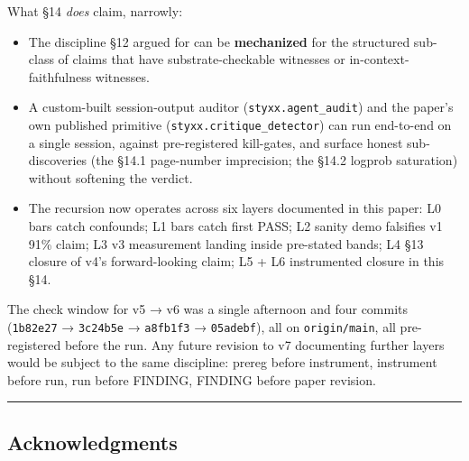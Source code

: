 \documentclass[
]{article}
\providecommand{\tightlist}{%
  \setlength{\itemsep}{0pt}\setlength{\parskip}{0pt}}
\begin{document}
What §14 \emph{does} claim, narrowly:

\begin{itemize}
\tightlist
\item
  The discipline §12 argued for can be \textbf{mechanized} for the
  structured sub-class of claims that have substrate-checkable witnesses
  or in-context-faithfulness witnesses.
\item
  A custom-built session-output auditor (\texttt{styxx.agent\_audit})
  and the paper's own published primitive
  (\texttt{styxx.critique\_detector}) can run end-to-end on a single
  session, against pre-registered kill-gates, and surface honest
  sub-discoveries (the §14.1 page-number imprecision; the §14.2 logprob
  saturation) without softening the verdict.
\item
  The recursion now operates across six layers documented in this paper:
  L0 bars catch confounds; L1 bars catch first PASS; L2 sanity demo
  falsifies v1 91\% claim; L3 v3 measurement landing inside pre-stated
  bands; L4 §13 closure of v4's forward-looking claim; L5 + L6
  instrumented closure in this §14.
\end{itemize}

The check window for v5 → v6 was a single afternoon and four commits
(\texttt{1b82e27} → \texttt{3c24b5e} → \texttt{a8fb1f3} →
\texttt{05adebf}), all on \texttt{origin/main}, all pre-registered
before the run. Any future revision to v7 documenting further layers
would be subject to the same discipline: prereg before instrument,
instrument before run, run before FINDING, FINDING before paper
revision.

\begin{center}\rule{0.5\linewidth}{0.5pt}\end{center}

\subsection{Acknowledgments}\label{acknowledgments}
\end{document}
